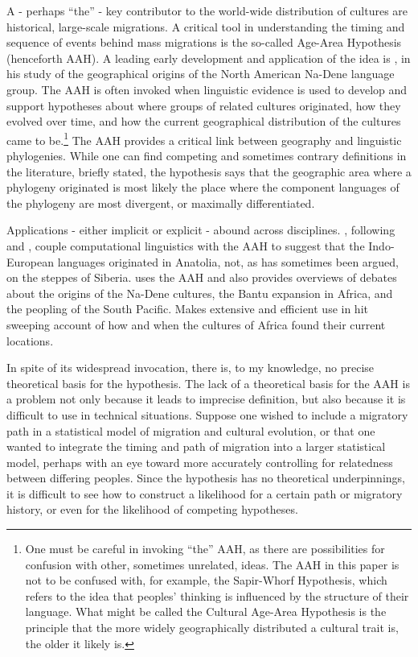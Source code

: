 \documentclass[11pt]{article}
\begin{document}
A - perhaps ``the'' - key contributor to the world-wide distribution of cultures are historical, large-scale migrations. A critical tool in understanding the timing and sequence of events behind mass migrations is the so-called Age-Area Hypothesis (henceforth AAH). A leading early development and application of the idea is \cite{sapir16}, in his study of the geographical origins of the North American Na-Dene language group. The AAH is often invoked when linguistic evidence is used to develop and support hypotheses about where groups of related  cultures originated, how they evolved over time, and how the current geographical distribution of the cultures came to be.\footnote{One must be careful in invoking ``the'' AAH, as there are possibilities for confusion with other, sometimes unrelated, ideas. The AAH in this paper is not to be confused with, for example, the Sapir-Whorf Hypothesis, which refers to the idea that peoples' thinking is influenced by the structure of their language. What might be called the Cultural Age-Area Hypothesis is the principle that the more widely geographically distributed a cultural trait is, the older it likely is. } The AAH provides a critical link between geography and linguistic phylogenies. While one can find competing and sometimes contrary definitions in the literature, briefly stated, the hypothesis says that the geographic area where a phylogeny originated is most likely the place where the component languages of the phylogeny are most divergent, or maximally differentiated.

Applications - either implicit or explicit  - abound across disciplines. \cite{atkinson03}, following \cite{renfrew87} and \cite{dogolpolsky88}, couple computational linguistics with the AAH to suggest that the Indo-European languages originated in Anatolia, not, as has sometimes been argued, on the steppes of Siberia. \cite{ruhlen94} uses the AAH and also provides overviews of debates about the origins of the Na-Dene cultures, the Bantu expansion in Africa, and the peopling of the South Pacific. \cite{ehret01} Makes extensive and efficient use in hit sweeping account of how and when the cultures of Africa found their current locations.

In spite of its widespread invocation, there is, to my knowledge, no precise theoretical basis for the hypothesis. The lack of a theoretical basis for the  AAH is a problem not only because it leads to imprecise definition, but also because it is difficult to use in technical situations. Suppose one wished to include a migratory path in a statistical model of migration and cultural evolution, or that one wanted to integrate the timing and path of migration into a larger statistical model, perhaps with an eye toward more accurately controlling for relatedness between differing peoples. Since the hypothesis has no theoretical underpinnings, it is difficult to see how to construct a likelihood for a certain path or migratory history, or even for the likelihood of competing hypotheses.
\end{document}
